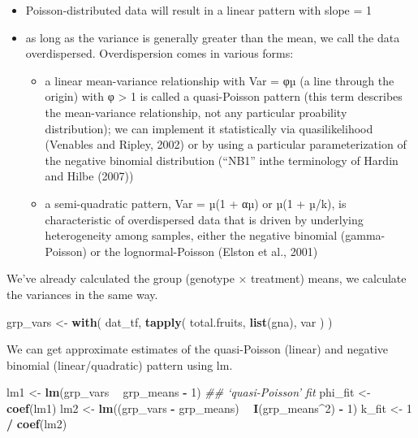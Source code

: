\documentclass[
  12pt,
]{book}
\newenvironment{Shaded}{\begin{snugshade}}{\end{snugshade}}
\newcommand{\CommentTok}[1]{\textcolor[rgb]{0.56,0.35,0.01}{\textit{#1}}}
\newcommand{\DecValTok}[1]{\textcolor[rgb]{0.00,0.00,0.81}{#1}}
\newcommand{\KeywordTok}[1]{\textcolor[rgb]{0.13,0.29,0.53}{\textbf{#1}}}
\newcommand{\NormalTok}[1]{#1}
\newcommand{\OperatorTok}[1]{\textcolor[rgb]{0.81,0.36,0.00}{\textbf{#1}}}
\newcommand{\StringTok}[1]{\textcolor[rgb]{0.31,0.60,0.02}{#1}}
\providecommand{\tightlist}{%
  \setlength{\itemsep}{0pt}\setlength{\parskip}{0pt}}
\begin{document}
\begin{itemize}
\tightlist
\item
  Poisson-distributed data will result in a linear pattern with slope = 1
\item
  as long as the variance is generally greater than the mean, we call the data overdispersed. Overdispersion comes in various forms:

  \begin{itemize}
  \tightlist
  \item
    a linear mean-variance relationship with Var = φµ (a line through the origin) with φ \textgreater{} 1 is called a quasi-Poisson pattern (this term describes the mean-variance relationship, not any particular proability distribution); we can implement it statistically via quasilikelihood (Venables and Ripley, 2002) or by using a particular parameterization of the negative binomial distribution (``NB1'' inthe terminology of Hardin and Hilbe (2007))
  \item
    a semi-quadratic pattern, Var = µ(1 + αµ) or µ(1 + µ/k), is characteristic of overdispersed data that is driven by underlying heterogeneity among samples, either the negative binomial (gamma-Poisson) or the lognormal-Poisson (Elston et al., 2001)
  \end{itemize}
\end{itemize}

We've already calculated the group (genotype × treatment) means, we calculate the variances in the same way.

\begin{Shaded}
\begin{Highlighting}[]
\NormalTok{grp_vars <-}\StringTok{ }\KeywordTok{with}\NormalTok{(}
\NormalTok{  dat_tf,}
  \KeywordTok{tapply}\NormalTok{(}
\NormalTok{    total.fruits,}
    \KeywordTok{list}\NormalTok{(gna), var}
\NormalTok{  )}
\NormalTok{)}
\end{Highlighting}
\end{Shaded}

We can get approximate estimates of the quasi-Poisson (linear) and negative binomial (linear/quadratic) pattern using lm.

\begin{Shaded}
\begin{Highlighting}[]
\NormalTok{lm1 <-}\StringTok{ }\KeywordTok{lm}\NormalTok{(grp_vars }\OperatorTok{~}\StringTok{ }\NormalTok{grp_means }\OperatorTok{-}\StringTok{ }\DecValTok{1}\NormalTok{) }\CommentTok{## `quasi-Poisson' fit}
\NormalTok{phi_fit <-}\StringTok{ }\KeywordTok{coef}\NormalTok{(lm1)}
\NormalTok{lm2 <-}\StringTok{ }\KeywordTok{lm}\NormalTok{((grp_vars }\OperatorTok{-}\StringTok{ }\NormalTok{grp_means) }\OperatorTok{~}\StringTok{ }\KeywordTok{I}\NormalTok{(grp_means}\OperatorTok{^}\DecValTok{2}\NormalTok{) }\OperatorTok{-}\StringTok{ }\DecValTok{1}\NormalTok{)}
\NormalTok{k_fit <-}\StringTok{ }\DecValTok{1} \OperatorTok{/}\StringTok{ }\KeywordTok{coef}\NormalTok{(lm2)}
\end{Highlighting}
\end{Shaded}
\end{document}
